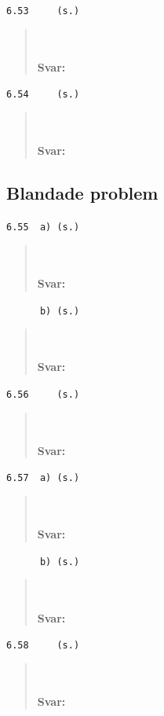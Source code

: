 \documentclass[a4paper]{article}
\newcommand{\tskcol}[1]{\textcolor{tskcol}{#1}}
\begin{document}
	\texttt{\tskcol{6.53~~~~ (s.)}}
	\begin{quotation}
		\noindent
		\\ \\
		\textbf{Svar:}
	\end{quotation}
	
	\texttt{\tskcol{6.54~~~~ (s.)}}
	\begin{quotation}
		\noindent
		\\ \\
		\textbf{Svar:}
	\end{quotation}
	
	\subsection*{Blandade problem}
	
	\texttt{\tskcol{6.55~~a) (s.)}}
	\begin{quotation}
		\noindent
		\\ \\
		\textbf{Svar:}
	\end{quotation}
	
	\texttt{\tskcol{~~~~~~b) (s.)}}
	\begin{quotation}
		\noindent
		\\ \\
		\textbf{Svar:}
	\end{quotation}
	
	\texttt{\tskcol{6.56~~~~ (s.)}}
	\begin{quotation}
		\noindent
		\\ \\
		\textbf{Svar:}
	\end{quotation}
	
	\texttt{\tskcol{6.57~~a) (s.)}}
	\begin{quotation}
		\noindent
		\\ \\
		\textbf{Svar:}
	\end{quotation}
	
	\texttt{\tskcol{~~~~~~b) (s.)}}
	\begin{quotation}
		\noindent
		\\ \\
		\textbf{Svar:}
	\end{quotation}
	
	\texttt{\tskcol{6.58~~~~ (s.)}}
	\begin{quotation}
		\noindent
		\\ \\
		\textbf{Svar:}
	\end{quotation}
	
\end{document}
